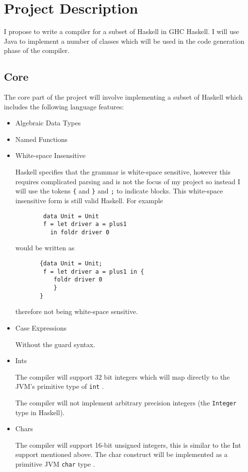 \documentclass[12pt,a4paper,twoside]{article}
\begin{document}
\section*{Project Description}
  I propose to write a compiler for a subset of Haskell in GHC Haskell. I will use Java to implement a number of classes which will be used in the
  code generation phase of the compiler.

  \subsection*{Core}

  The core part of the project will involve implementing a subset of Haskell which includes the following language features:
  \begin{itemize}
    \item Algebraic Data Types

    \item Named Functions


    \item White-space Insensitive

      Haskell specifies that the grammar is white-space sensitive, however this requires complicated parsing and is not the focus of my project so instead I will
      use the tokens \texttt{\{} and \texttt{\}} and \texttt{;} to indicate blocks. This white-space insensitive form is still valid Haskell.
      For example
      \begin{verbatim}
        data Unit = Unit
        f = let driver a = plus1
          in foldr driver 0
      \end{verbatim}
      would be written as
      \begin{verbatim}
       {data Unit = Unit;
        f = let driver a = plus1 in {
           foldr driver 0
           }
       }
      \end{verbatim}
      therefore not being white-space sensitive.

    \item Case Expressions

      Without the guard syntax.

    \item Ints

      The compiler will support 32 bit integers which will map directly to the JVM's primitive type of \texttt{int} \cite{jvm-spec8}.

      The compiler will not implement arbitrary precision integers (the \texttt{Integer} type in Haskell).

    \item Chars

      The compiler will support 16-bit unsigned integers, this is similar to the Int support mentioned above. The char construct will be implemented as a
      primitive JVM \texttt{char} type \cite{jvm-spec8}.


  \end{itemize}
\end{document}
